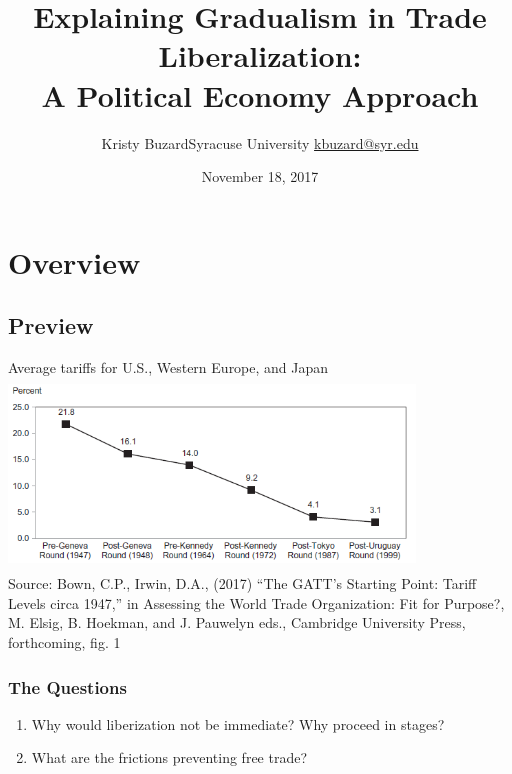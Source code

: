 \documentclass[handout]{beamer}
\title[Explaining Gradualism in Trade Liberalization \hspace{2.5in}\insertframenumber/\inserttotalframenumber]{Explaining Gradualism in Trade Liberalization: \\A Political Economy Approach}
\author[Kristy Buzard]{\texorpdfstring{Kristy Buzard\newline Syracuse University  \newline\url{kbuzard@syr.edu}}{Kristy Buzard}}
\date{November 18, 2017}
\begin{document}
\maketitle




\section{Overview}
\subsection{Preview}

\begin{frame}{Average tariffs for U.S., Western Europe, and Japan}
	\includegraphics[height=2in, width=4.25in]{linegraph-Bown-Irwin.png} \\
	\scriptsize Source: Bown, C.P., Irwin, D.A., (2017) ``The GATT's Starting Point: Tariff Levels circa 1947,'' in Assessing the World Trade Organization: Fit for Purpose?, M. Elsig, B. Hoekman, and J. Pauwelyn eds., Cambridge University Press, forthcoming, fig. 1
\end{frame}

\begin{frame}
\frametitle{The Questions}
\pause
\begin{enumerate}[<+->]
	\item Why would liberization not be immediate? Why proceed in stages?
  \item What are the frictions preventing free trade? %
\end{enumerate}
\end{frame}
\end{document}

